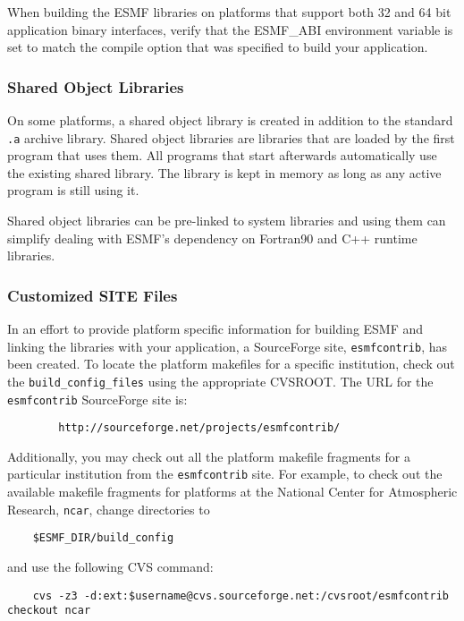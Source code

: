 When building the ESMF libraries on platforms that support both
32 and 64 bit application binary interfaces, verify that the ESMF\_ABI
environment variable is set to match the compile option that was specified 
to build your application.

\subsubsection{Shared Object Libraries}

On some platforms, a shared object library is created in addition to the
standard {\tt .a} archive library.
Shared object libraries are libraries that are loaded by the first program 
that uses them. All programs that start afterwards automatically use the 
existing shared library. The library is kept in memory as long as any 
active program is still using it. 

Shared object libraries can be pre-linked to system libraries and using them
can simplify dealing with ESMF's dependency on Fortran90 and C++ runtime 
libraries. 

\subsubsection{Customized SITE Files}

In an effort to provide platform specific information for building ESMF 
and linking the libraries with your application, a SourceForge 
site, {\tt esmfcontrib}, has been created.
To locate the platform makefiles for a specific institution, check out 
the {\tt build\_config\_files} using the appropriate CVSROOT.
The URL for the {\tt esmfcontrib} SourceForge site is:

\begin{verbatim}
        http://sourceforge.net/projects/esmfcontrib/
\end{verbatim}

Additionally, you may check out all the platform makefile fragments 
for a particular institution from the {\tt esmfcontrib} site. For example, 
to check out the available makefile fragments for platforms at the
National Center for Atmospheric Research, {\tt ncar}, change directories to

\begin{verbatim}
 	$ESMF_DIR/build_config
\end{verbatim}

and use the following CVS command:

\begin{verbatim}
	cvs -z3 -d:ext:$username@cvs.sourceforge.net:/cvsroot/esmfcontrib checkout ncar
\end{verbatim}

